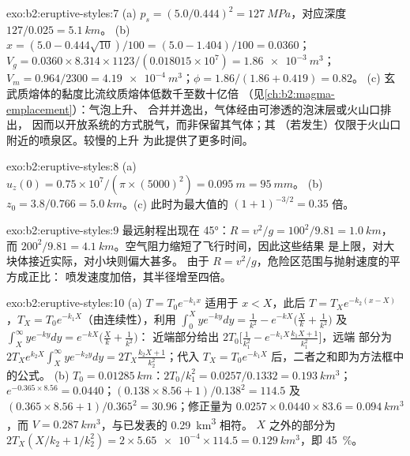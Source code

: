 \begin{solution}{exo:b2:eruptive-styles:7}
(a) $p_s = (5.0/0.444)^2 = \qty{127}{MPa}$，对应深度 $127/0.025 = \qty{5.1}{km}$。
(b) $x = (5.0 - 0.444\sqrt{10})/100 = (5.0 - 1.404)/100 = 0.0360$；
$V_g = 0.0360\times8.314\times1123/(0.018015\times10^7) = \qty{1.86e-3}{m^3}$；
$V_m = 0.964/2300 = \qty{4.19e-4}{m^3}$；$\phi = 1.86/(1.86 + 0.419) = 0.82$。
(c) 玄武质熔体的黏度比流纹质熔体低数千至数十亿倍
（见\cref{ch:b2:magma-emplacement}）：气泡上升、
合并并逸出，气体经由可渗透的泡沫层或火山口排出，
因而以开放系统的方式脱气，而非保留其气体；其
（若发生）仅限于火山口附近的喷泉区。较慢的上升
为此提供了更多时间。
\end{solution}

\begin{solution}{exo:b2:eruptive-styles:8}
(a) $u_z(0) = 0.75\times10^7/(\pi\times(5000)^2) = \qty{0.095}{m} = \qty{95}{mm}$。
(b) $z_0 = 3.8/0.766 = \qty{5.0}{km}$。(c) 此时为最大值的 $(1 + 1)^{-3/2} = 0.35$
倍。
\end{solution}

\begin{solution}{exo:b2:eruptive-styles:9}
最远射程出现在 \ang{45}：$R = v^2/g = 100^2/9.81 = \qty{1.0}{km}$，
而 $200^2/9.81 = \qty{4.1}{km}$。空气阻力缩短了飞行时间，因此这些结果
是上限，对大块体接近实际，对小块则偏大甚多。
由于 $R = v^2/g$，危险区范围与抛射速度的平方成正比：
喷发速度加倍，其半径增至四倍。
\end{solution}

\begin{solution}{exo:b2:eruptive-styles:10}
(a) $T = T_0e^{-k_1x}$ 适用于 $x < X$，此后 $T = T_Xe^{-k_2(x - X)}$，$T_X =
T_0e^{-k_1X}$（由连续性），利用 $\int_0^X ye^{-ky}dy = \frac{1}{k^2} - e^{-kX}\big(\frac{X}{k} +
\frac{1}{k^2}\big)$ 及 $\int_X^\infty ye^{-ky}dy = e^{-kX}\big(\frac{X}{k} +
\frac{1}{k^2}\big)$：
近端部分给出 $2T_0\big[\frac{1}{k_1^2} - e^{-k_1X}\frac{k_1X + 1}{k_1^2}\big]$，远端
部分为 $2T_Xe^{k_2X}\int_X^\infty ye^{-k_2y}dy = 2T_X\frac{k_2X + 1}{k_2^2}$；代入 $T_X =
T_0e^{-k_1X}$ 后，二者之和即为方法框中的公式。
(b) $T_0 = \qty{0.01285}{km}$：$2T_0/k_1^2 = 0.0257/0.1332 = \qty{0.193}{km^3}$；
$e^{-0.365\times8.56} = 0.0440$；$(0.138\times8.56 + 1)/0.138^2 = 114.5$ 及
$(0.365\times8.56 + 1)/0.365^2 = 30.96$；修正量为 $0.0257\times0.0440\times83.6
= \qty{0.094}{km^3}$，而 $V = \qty{0.287}{km^3}$，与已发表的 \qty{0.29}{km^3} 相符。
$X$ 之外的部分为 $2T_X(X/k_2 + 1/k_2^2) = 2\times\num{5.65e-4}\times114.5 =
\qty{0.129}{km^3}$，即 \qty{45}{\percent}。
\end{solution}

